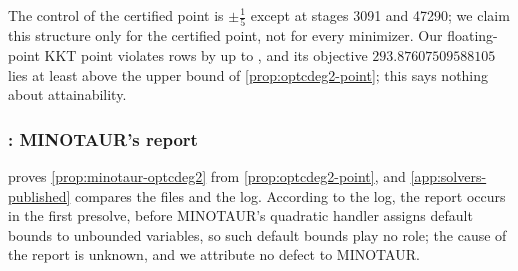 The control of the certified point is $\pm\tfrac15$ except at stages 3091 and 47290; we claim this structure only for the certified point, not for every minimizer.
Our floating-point KKT point violates rows by up to , and its objective $293.87607509588105$ lies at least  above the upper bound of \cref{prop:optcdeg2-point}; this says nothing about attainability.

\begin{certbox}
\end{certbox}

\subsubsection{: MINOTAUR's report}\label{app:optcdeg2-minotaur}

 proves \cref{prop:minotaur-optcdeg2} from \cref{prop:optcdeg2-point}, and \cref{app:solvers-published} compares the files and the log.
According to the log, the report occurs in the first presolve, before MINOTAUR's quadratic handler assigns default bounds to unbounded variables, so such default bounds play no role; the cause of the report is unknown, and we attribute no defect to MINOTAUR.
